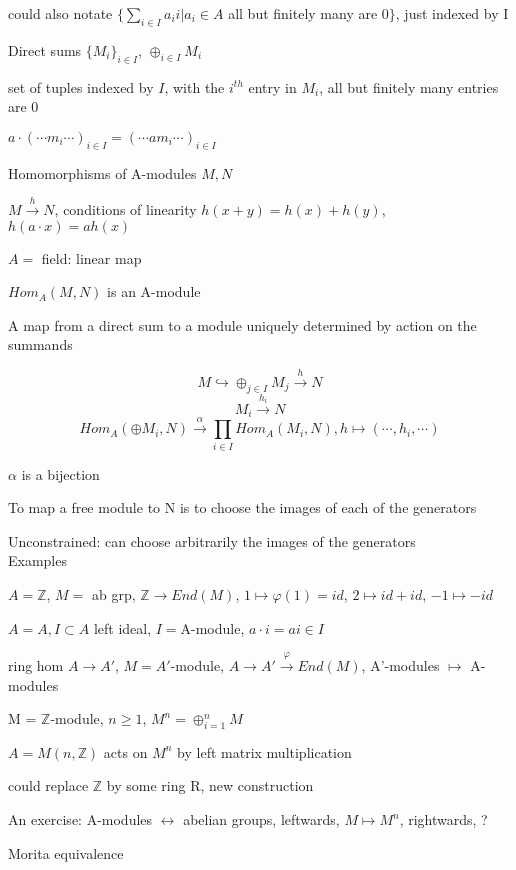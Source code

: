 \documentclass[12pt]{article}
\begin{document}
could also notate $\{\sum_{i \in I}a_ii | a_i \in A$ all but finitely many are 0$\}$, just indexed by I

\noindent
Direct sums $\{M_i\}_{i \in I}$, $\oplus_{i \in I}M_i$

set of tuples indexed by $I$, with the $i^{th}$ entry in $M_i$, all but finitely many entries are 0

$a \cdot (\cdots m_i \cdots)_{i \in I} = (\cdots am_i \cdots)_{i \in I}$

\noindent
Homomorphisms of A-modules $M, N$

$M \xrightarrow{h} N$, conditions of linearity $h(x + y) = h(x) + h(y)$, $h(a \cdot x) = a h(x)$

$A =$ field: linear map

$Hom_A(M, N)$ is an A-module

\noindent
A map from a direct sum to a module uniquely determined by action on the summands

$$M \hookrightarrow \oplus_{j \in I}M_j \xrightarrow{h} N$$ $$M_i \xrightarrow{h_i} N$$ $$Hom_A(\oplus M_i, N) \xrightarrow{\alpha} \prod_{i \in I} Hom_A(M_i, N), h \mapsto (\cdots, h_i, \cdots)$$

$\alpha$ is a bijection

To map a free module to N is to choose the images of each of the generators

Unconstrained: can choose arbitrarily the images of the generators\\

\noindent
Examples

\noindent
$A = \mathds{Z}$, $M =$ ab grp, $\mathds{Z} \to End(M)$, $1 \mapsto \varphi(1) = id$, $2 \mapsto id + id$, $-1 \mapsto -id$

\noindent
$A = A, I \subset A$ left ideal, $I = $A-module, $a \cdot i = ai \in I$

\noindent
ring hom $A \to A'$, $M = A'$-module, $A \to A' \xrightarrow{\varphi} End(M)$, A'-modules $\mapsto$ A-modules

\noindent
M = $\mathds{Z}$-module, $n \geq 1$, $M^n = \oplus_{i = 1}^n M$

$A = M(n, \mathds{Z})$ acts on $M^n$ by left matrix multiplication

could replace $\mathds{Z}$ by some ring R, new construction

An exercise: A-modules $\leftrightarrow$ abelian groups, leftwards, $M \mapsto M^n$, rightwards, ?

Morita equivalence
\end{document}
